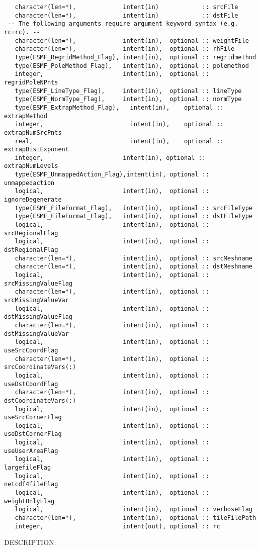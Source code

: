 \begin{verbatim} 
   character(len=*),             intent(in)            :: srcFile
   character(len=*),             intent(in)            :: dstFile
 -- The following arguments require argument keyword syntax (e.g. rc=rc). --
   character(len=*),             intent(in),  optional :: weightFile
   character(len=*),             intent(in),  optional :: rhFile
   type(ESMF_RegridMethod_Flag), intent(in),  optional :: regridmethod
   type(ESMF_PoleMethod_Flag),   intent(in),  optional :: polemethod
   integer,                      intent(in),  optional :: regridPoleNPnts
   type(ESMF_LineType_Flag),     intent(in),  optional :: lineType
   type(ESMF_NormType_Flag),     intent(in),  optional :: normType
   type(ESMF_ExtrapMethod_Flag),   intent(in),    optional :: extrapMethod
   integer,                        intent(in),    optional :: extrapNumSrcPnts
   real,                           intent(in),    optional :: extrapDistExponent
   integer,                      intent(in), optional :: extrapNumLevels
   type(ESMF_UnmappedAction_Flag),intent(in), optional :: unmappedaction
   logical,                      intent(in),  optional :: ignoreDegenerate
   type(ESMF_FileFormat_Flag),   intent(in),  optional :: srcFileType
   type(ESMF_FileFormat_Flag),   intent(in),  optional :: dstFileType
   logical,                      intent(in),  optional :: srcRegionalFlag
   logical,                      intent(in),  optional :: dstRegionalFlag
   character(len=*),             intent(in),  optional :: srcMeshname
   character(len=*),             intent(in),  optional :: dstMeshname
   logical,                      intent(in),  optional :: srcMissingValueFlag
   character(len=*),             intent(in),  optional :: srcMissingValueVar
   logical,                      intent(in),  optional :: dstMissingValueFlag
   character(len=*),             intent(in),  optional :: dstMissingValueVar
   logical,                      intent(in),  optional :: useSrcCoordFlag
   character(len=*),             intent(in),  optional :: srcCoordinateVars(:)
   logical,                      intent(in),  optional :: useDstCoordFlag
   character(len=*),             intent(in),  optional :: dstCoordinateVars(:)
   logical,                      intent(in),  optional :: useSrcCornerFlag
   logical,                      intent(in),  optional :: useDstCornerFlag
   logical,                      intent(in),  optional :: useUserAreaFlag
   logical,                      intent(in),  optional :: largefileFlag
   logical,                      intent(in),  optional :: netcdf4fileFlag
   logical,                      intent(in),  optional :: weightOnlyFlag
   logical,                      intent(in),  optional :: verboseFlag
   character(len=*),             intent(in),  optional :: tileFilePath
   integer,                      intent(out), optional :: rc
 \end{verbatim}
{\sf DESCRIPTION:\\ }


